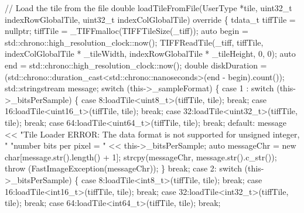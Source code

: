 \begin{DoxyCode}
  \textcolor{comment}{// Load the tile from the file }
  \textcolor{keywordtype}{double} loadTileFromFile(UserType *tile, uint32\_t indexRowGlobalTile, uint32\_t indexColGlobalTile)\textcolor{keyword}{
       override }\{
    tdata\_t tiffTile = \textcolor{keyword}{nullptr};
    tiffTile = \_TIFFmalloc(TIFFTileSize(\_tiff));
    \textcolor{keyword}{auto} begin = std::chrono::high\_resolution\_clock::now();
    TIFFReadTile(\_tiff, tiffTile, indexColGlobalTile * \_tileWidth, indexRowGlobalTile * \_tileHeight, 0, 0);
    \textcolor{keyword}{auto} end = std::chrono::high\_resolution\_clock::now();
    \textcolor{keywordtype}{double} diskDuration = (std::chrono::duration\_cast<std::chrono::nanoseconds>(end - begin).count());
    std::stringstream message;
    \textcolor{keywordflow}{switch} (this->\_sampleFormat) \{
      \textcolor{keywordflow}{case} 1 :
        \textcolor{keywordflow}{switch} (this->\_bitsPerSample) \{
          \textcolor{keywordflow}{case} 8:loadTile<uint8\_t>(tiffTile, tile);
            \textcolor{keywordflow}{break};
          \textcolor{keywordflow}{case} 16:loadTile<uint16\_t>(tiffTile, tile);
            \textcolor{keywordflow}{break};
          \textcolor{keywordflow}{case} 32:loadTile<uint32\_t>(tiffTile, tile);
            \textcolor{keywordflow}{break};
          \textcolor{keywordflow}{case} 64:loadTile<uint64\_t>(tiffTile, tile);
            \textcolor{keywordflow}{break};
          \textcolor{keywordflow}{default}:
            message << \textcolor{stringliteral}{"Tile Loader ERROR: The data format is not supported for unsigned integer, "}
                \textcolor{stringliteral}{"number bits per pixel = "} << this->\_bitsPerSample;
            \textcolor{keyword}{auto} messageChr = \textcolor{keyword}{new} \textcolor{keywordtype}{char}[message.str().length() + 1];
            strcpy(messageChr, message.str().c\_str());
            \textcolor{keywordflow}{throw} (FastImageException(messageChr));
        \}
        \textcolor{keywordflow}{break};
      \textcolor{keywordflow}{case} 2:
        \textcolor{keywordflow}{switch} (this->\_bitsPerSample) \{
          \textcolor{keywordflow}{case} 8:loadTile<int8\_t>(tiffTile, tile);
            \textcolor{keywordflow}{break};
          \textcolor{keywordflow}{case} 16:loadTile<int16\_t>(tiffTile, tile);
            \textcolor{keywordflow}{break};
          \textcolor{keywordflow}{case} 32:loadTile<int32\_t>(tiffTile, tile);
            \textcolor{keywordflow}{break};
          \textcolor{keywordflow}{case} 64:loadTile<int64\_t>(tiffTile, tile);
            \textcolor{keywordflow}{break};

\end{DoxyCode}
